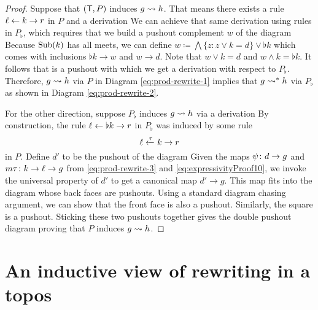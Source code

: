 \documentclass[oneside]{amsart}
\begin{document}
\begin{proof}
  Suppose that $ ( \mathsf{T},P ) $ induces
  $ g \rightsquigarrow h $. That means there exists a
  rule $ \ell \leftarrow k \to r $ in $ P $ and a
  derivation 
  We can achieve that same derivation using rules
  in $ P_\flat $, which requires that we build a
  pushout complement $ w $ of the diagram
   Because
  $ \operatorname{Sub} ( k )$ has all meets, we can define
  $ w \coloneqq \bigwedge \{ z \colon z \vee k = d
  \} \vee \flat k$ which comes with inclusions
  $ \flat k \to w $ and $ w \to d $.  Note that
  $ w \vee k = d $ and $ w \wedge k = \flat k
  $. It follows that
   is a
  pushout with which we get a derivation
   with
  respect to $ P_\flat $.  Therefore,
  $ g \rightsquigarrow h $ via $ P $ in Diagram
  \eqref{eq:prod-rewrite-1} implies that
  $ g \rightsquigarrow^\ast h $ via $ P_\flat $ as shown in
  Diagram \eqref{eq:prod-rewrite-2}.

  For the other direction, suppose $ P_\flat $
  induces $ g \rightsquigarrow h $ via a derivation
   By
  construction, the rule
  $ \ell \leftarrow \flat k \to r $ in $ P_\flat $ was
  induced by some rule
  \begin{equation}\label{eq:expressivityProof10}
    \ell \xleftarrow{\tau} k \to r
  \end{equation}
  in $ P $. Define $ d' $ to be the pushout of the
  diagram 
  Given the maps $ \psi \colon d \to g $ and
  $ m \tau \colon k \to \ell \to g$ from
  \eqref{eq:prod-rewrite-3} and
  \eqref{eq:expressivityProof10}, we invoke the
  universal property of $ d' $ to get a canonical
  map $ d' \to g $. This map fits into the diagram
   whose back
  faces are pushouts. Using a standard diagram
  chasing argument, we can show that the front
  face is also a pushout.  Similarly, the square
   is a
  pushout.  Sticking these two pushouts together
  gives the double pushout diagram
   proving
  that $ P $ induces $ g \rightsquigarrow h $.
\end{proof}



\section{An inductive view of rewriting in a topos}
\label{sec:charRewrRelat}
\end{document}

